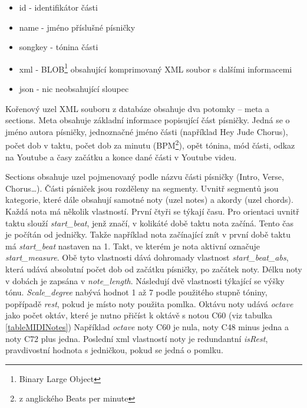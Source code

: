 \begin{itemize}
    \item id - identifikátor části
    \item name - jméno příslušné písničky
    \item songkey - tónina části
    \item xml - BLOB\footnote{Binary Large Object} obsahující komprimovaný XML soubor s dalšími informacemi
    \item json - nic neobsahující sloupec
\end{itemize}

Kořenový uzel XML souboru z databáze obsahuje dva potomky -- meta a sections.
Meta obsahuje základní informace popisující část písničky.
Jedná se o jméno autora písničky, jednoznačné jméno části (například Hey Jude Chorus),
počet dob v taktu, počet dob za minutu (BPM\footnote{z anglického Beats per minute}),
opět tónina, mód části,
odkaz na Youtube a časy začátku a konce dané části v Youtube videu.
\par
Sections obsahuje uzel pojmenovaný podle názvu části písničky 
(Intro, Verse, Chorus\dots).
Části písniček jsou rozděleny na segmenty.
Uvnitř segmentů jsou kategorie, 
které dále obsahují samotné noty (uzel notes) a akordy (uzel chords). 
Každá nota má několik vlastností.
První čtyři se týkají času.
Pro orientaci uvnitř taktu slouží \emph{start\_beat}, 
jenž značí, v kolikáté době taktu nota začíná.
Tento čas je počítán od jedničky.
Takže například nota začínající znít v první době taktu
má \emph{start\_beat} nastaven na 1.
Takt, ve kterém je nota aktivní označuje \emph{start\_measure}.
Obě tyto vlastnosti dává dohromady vlastnost \emph{start\_beat\_abs},
která udává absolutní počet dob od začátku písničky, 
po začátek noty.
Délku noty v dobách je zapsána v \emph{note\_length}.
Následují dvě vlastnosti týkající se výšky tónu.
\emph{Scale\_degree} nabývá hodnot 1 až 7 podle použitého stupně tóniny,
popřípadě \emph{rest}, pokud je místo noty použita pomlka.
Oktávu noty udává \emph{octave} jako počet oktáv, 
které je nutno přičíst k oktávě s notou C60 (viz tabulka \ref{tableMIDINotes})
Například \emph{octave} noty C60 je nula, 
noty C48 minus jedna a noty C72 plus jedna.
Poslední xml vlastností noty je redundantní \emph{isRest},
pravdivostní hodnota s jedničkou, pokud se jedná o pomlku. 
\par

